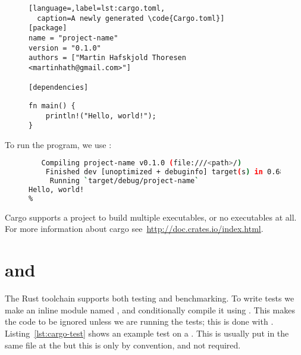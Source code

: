 \documentclass[b5paper]{report}
\begin{document}
\begin{appendices}
  \begin{figure}[ht]
  \begin{lstlisting}[language=,label=lst:cargo.toml,
  caption=A newly generated \code{Cargo.toml}]
[package]
name = "project-name"
version = "0.1.0"
authors = ["Martin Hafskjold Thoresen <martinhath@gmail.com>"]

[dependencies]
  \end{lstlisting}
\end{figure}

\begin{figure}[ht]
  \begin{lstlisting}[caption=Hello World in Rust,label=lst:hello-world]
fn main() {
    println!("Hello, world!");
}
  \end{lstlisting}
\end{figure}

  To run the program, we use \cargo{}:

  \begin{figure}[ht]
  \begin{lstlisting}[language=Bash,numbers=none]
% cargo run
   Compiling project-name v0.1.0 (file:///<path>/)
    Finished dev [unoptimized + debuginfo] target(s) in 0.68 secs
     Running `target/debug/project-name`
Hello, world!
%
  \end{lstlisting}
\end{figure}

  Cargo supports a project to build multiple executables, or no executables at all.
  For more information about cargo see~\url{http://doc.crates.io/index.html}.

  \section{\code{\#[test]} and \code{\#[bench]}}
  \label{sec:rust-test}
  The Rust toolchain supports both testing and benchmarking. To write tests we
  make an inline module named , and conditionally compile it using
  . This makes the code to be ignored unless we are running
  the tests; this is done with . Listing~\ref{lst:cargo-test}
  shows an example test on a . This is usually put in the same file
  at the  but this is only by convention, and not required.


\end{appendices}
\end{document}
